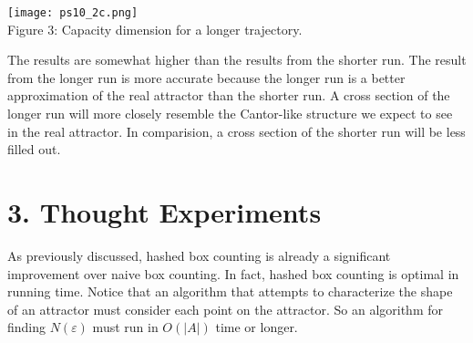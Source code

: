 \documentclass[12pt, letterpaper]{article}
\begin{document}
\begin{center}
\texttt{[image: ps10\_2c.png]}
\\
Figure 3: Capacity dimension for a longer trajectory.
\end{center}

The results are somewhat higher than the results from the shorter run. The result
from the longer run is more accurate because the longer run is a better 
approximation of the real attractor than the shorter run. A cross section of the 
longer run will more closely resemble the Cantor-like structure we expect to see
in the real attractor. In comparision, a cross section of the shorter run will be 
less filled out. 

\section*{3. Thought Experiments}

As previously discussed, hashed box counting is already a significant 
improvement over naive box counting. In fact, hashed box counting
is optimal in running time. Notice that an algorithm that attempts to characterize
the shape of an attractor must consider each point on the attractor. So an 
algorithm for finding $N(\varepsilon)$ must run in $O(|A|)$ time or longer.
\end{document}

